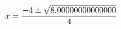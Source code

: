 \documentclass[preview]{standalone}
\begin{document}
\begin{align*}
\special{dvisvgm:raw <g id='unique000'>}x=\frac{-4\pm\sqrt{8.00000000000000}}{4}\special{dvisvgm:raw </g>}
\end{align*}
\end{document}
